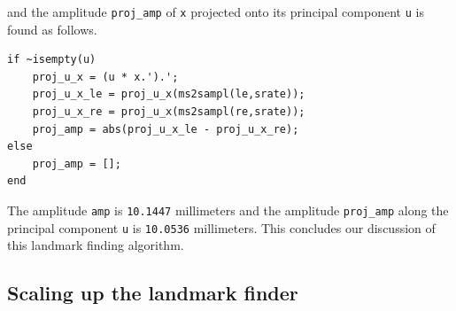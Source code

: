 \documentclass[a4paper, 12pt]{article}
\begin{document}
and the amplitude \texttt{proj\_amp} of \texttt{x} projected onto its principal component \texttt{u} is found as follows.
\begin{verbatim}
if ~isempty(u)
    proj_u_x = (u * x.').';
    proj_u_x_le = proj_u_x(ms2sampl(le,srate)); 
    proj_u_x_re = proj_u_x(ms2sampl(re,srate));
    proj_amp = abs(proj_u_x_le - proj_u_x_re);
else
    proj_amp = [];
end
\end{verbatim}
The amplitude \texttt{amp} is \texttt{10.1447} millimeters and the amplitude \texttt{proj\_amp} along the principal component \texttt{u} is \texttt{10.0536} millimeters. This concludes our discussion of this landmark finding algorithm.

\subsection{Scaling up the landmark finder}
\label{subsec:mtSet}
\end{document}
